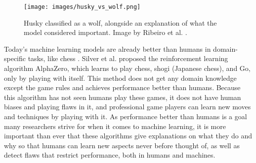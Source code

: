 \begin{figure}[htb]
    \centering
    \texttt{[image: images/husky\_vs\_wolf.png]}
    \caption[Husky classified as a wolf, alongside an explanation of what the model considered important.]{Husky classified as a wolf, alongside an explanation of what the model considered important. Image by Ribeiro et al. \cite{ribeiroWhyShouldTrust2016}.}
    \label{fig:wolf_husky}
\end{figure} 


Today's machine learning models are already better than humans in domain-specific tasks, like chess \cite{campbellDeepBlue2002}. Silver et al. \cite{silverGeneralReinforcementLearning2018} proposed the reinforcement learning algorithm AlphaZero, which learns to play chess, shogi (Japanese chess), and Go, only by playing with itself. This method does not get any domain knowledge except the game rules and achieves performance better than humans. Because this algorithm has not seen humans play these games, it does not have human biases and playing flaws in it, and professional game players can learn new moves and techniques by playing with it. 
As performance better than humans is a goal many researchers strive for when it comes to machine learning, it is more important than ever that these algorithms give explanations on what they do and why so that humans can learn new aspects never before thought of, as well as detect flaws that restrict performance, both in humans and machines.
